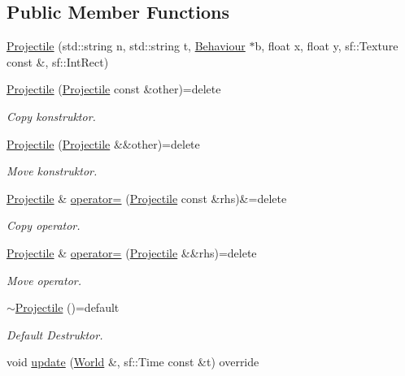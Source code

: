 \subsection*{Public Member Functions}
\begin{DoxyCompactItemize}
\item 
\hyperlink{classProjectile_a5898ed148789733b461db3b662cb2e12}{Projectile} (std\+::string n, std\+::string t, \hyperlink{classBehaviour}{Behaviour} $\ast$b, float x, float y, sf\+::\+Texture const \&, sf\+::\+Int\+Rect)
\item 
\hyperlink{classProjectile_ab1b6aba20a26659c6e48ca04fd6fcdd9}{Projectile} (\hyperlink{classProjectile}{Projectile} const \&other)=delete
\begin{DoxyCompactList}\small\item\em Copy konstruktor. \end{DoxyCompactList}\item 
\hyperlink{classProjectile_ada97affd8ca4c6e99b8bd2e8f2acd4ef}{Projectile} (\hyperlink{classProjectile}{Projectile} \&\&other)=delete
\begin{DoxyCompactList}\small\item\em Move konstruktor. \end{DoxyCompactList}\item 
\hyperlink{classProjectile}{Projectile} \& \hyperlink{classProjectile_ad60195da40c606e67b50ad334c59459a}{operator=} (\hyperlink{classProjectile}{Projectile} const \&rhs)\&=delete
\begin{DoxyCompactList}\small\item\em Copy operator. \end{DoxyCompactList}\item 
\hyperlink{classProjectile}{Projectile} \& \hyperlink{classProjectile_a6de99820546dbd177ee4c20cf90b7bce}{operator=} (\hyperlink{classProjectile}{Projectile} \&\&rhs)=delete
\begin{DoxyCompactList}\small\item\em Move operator. \end{DoxyCompactList}\item 
\hyperlink{classProjectile_a74de98e362b6944a533663db8a45340c}{$\sim$\+Projectile} ()=default
\begin{DoxyCompactList}\small\item\em Default Destruktor. \end{DoxyCompactList}\item 
void \hyperlink{classProjectile_a48d52d5d9db6e3af4aae8ded6afa6544}{update} (\hyperlink{classWorld}{World} \&, sf\+::\+Time const \&t) override

\end{DoxyCompactItemize}
